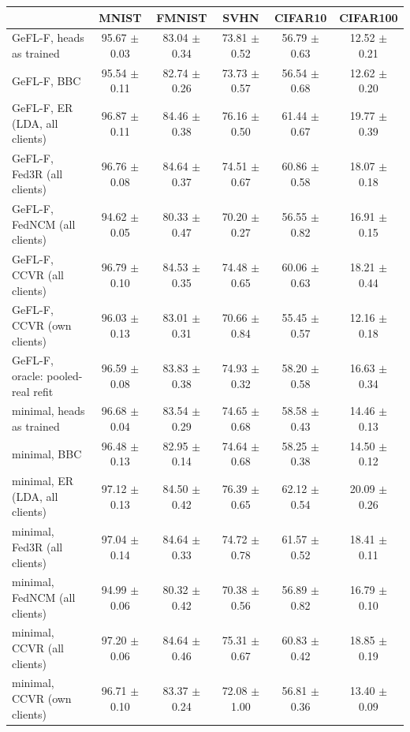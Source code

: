 \begin{tabular}{lccccc}
\toprule
 & MNIST & FMNIST & SVHN & CIFAR10 & CIFAR100 \\
\midrule
GeFL-F, heads as trained & 95.67 $\pm$ 0.03 & 83.04 $\pm$ 0.34 & 73.81 $\pm$ 0.52 & 56.79 $\pm$ 0.63 & 12.52 $\pm$ 0.21 \\
GeFL-F, BBC & 95.54 $\pm$ 0.11 & 82.74 $\pm$ 0.26 & 73.73 $\pm$ 0.57 & 56.54 $\pm$ 0.68 & 12.62 $\pm$ 0.20 \\
GeFL-F, ER (LDA, all clients) & 96.87 $\pm$ 0.11 & 84.46 $\pm$ 0.38 & 76.16 $\pm$ 0.50 & 61.44 $\pm$ 0.67 & 19.77 $\pm$ 0.39 \\
GeFL-F, Fed3R (all clients) & 96.76 $\pm$ 0.08 & 84.64 $\pm$ 0.37 & 74.51 $\pm$ 0.67 & 60.86 $\pm$ 0.58 & 18.07 $\pm$ 0.18 \\
GeFL-F, FedNCM (all clients) & 94.62 $\pm$ 0.05 & 80.33 $\pm$ 0.47 & 70.20 $\pm$ 0.27 & 56.55 $\pm$ 0.82 & 16.91 $\pm$ 0.15 \\
GeFL-F, CCVR (all clients) & 96.79 $\pm$ 0.10 & 84.53 $\pm$ 0.35 & 74.48 $\pm$ 0.65 & 60.06 $\pm$ 0.63 & 18.21 $\pm$ 0.44 \\
GeFL-F, CCVR (own clients) & 96.03 $\pm$ 0.13 & 83.01 $\pm$ 0.31 & 70.66 $\pm$ 0.84 & 55.45 $\pm$ 0.57 & 12.16 $\pm$ 0.18 \\
GeFL-F, oracle: pooled-real refit & 96.59 $\pm$ 0.08 & 83.83 $\pm$ 0.38 & 74.93 $\pm$ 0.32 & 58.20 $\pm$ 0.58 & 16.63 $\pm$ 0.34 \\
minimal, heads as trained & 96.68 $\pm$ 0.04 & 83.54 $\pm$ 0.29 & 74.65 $\pm$ 0.68 & 58.58 $\pm$ 0.43 & 14.46 $\pm$ 0.13 \\
minimal, BBC & 96.48 $\pm$ 0.13 & 82.95 $\pm$ 0.14 & 74.64 $\pm$ 0.68 & 58.25 $\pm$ 0.38 & 14.50 $\pm$ 0.12 \\
minimal, ER (LDA, all clients) & 97.12 $\pm$ 0.13 & 84.50 $\pm$ 0.42 & 76.39 $\pm$ 0.65 & 62.12 $\pm$ 0.54 & 20.09 $\pm$ 0.26 \\
minimal, Fed3R (all clients) & 97.04 $\pm$ 0.14 & 84.64 $\pm$ 0.33 & 74.72 $\pm$ 0.78 & 61.57 $\pm$ 0.52 & 18.41 $\pm$ 0.11 \\
minimal, FedNCM (all clients) & 94.99 $\pm$ 0.06 & 80.32 $\pm$ 0.42 & 70.38 $\pm$ 0.56 & 56.89 $\pm$ 0.82 & 16.79 $\pm$ 0.10 \\
minimal, CCVR (all clients) & 97.20 $\pm$ 0.06 & 84.64 $\pm$ 0.46 & 75.31 $\pm$ 0.67 & 60.83 $\pm$ 0.42 & 18.85 $\pm$ 0.19 \\
minimal, CCVR (own clients) & 96.71 $\pm$ 0.10 & 83.37 $\pm$ 0.24 & 72.08 $\pm$ 1.00 & 56.81 $\pm$ 0.36 & 13.40 $\pm$ 0.09 \\

\end{tabular}

